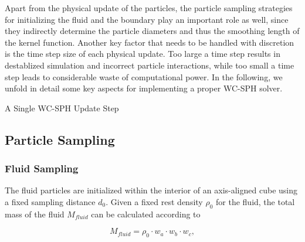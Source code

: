 \documentclass[
	11pt, 
	DIV10,
	ngerman,
	a4paper, 
	oneside, 
	headings=normal, 
	captions=tableheading,
	final, 
	numbers=noenddot
]{scrartcl}
\begin{document}
Apart from the physical update of the particles, the particle sampling strategies for initializing the fluid and the boundary play an important role as well, since they indirectly determine the particle diameters and thus the smoothing length of the kernel function. Another key factor that needs to be handled with discretion is the time step size of each physical update. Too large a time step results in destablized simulation and incorrect particle interactions, while too small a time step leads to considerable waste of computational power. In the following, we unfold in detail some key aspects for implementing a proper WC-SPH solver.

\large
\begin{algorithm}
	\DontPrintSemicolon
	\SetAlgoLined
	\caption{\label{alg1} A Single WC-SPH Update Step}
\end{algorithm}
\normalsize

\subsection{Particle Sampling}
\subsubsection{Fluid Sampling}

The fluid particles are initialized within the interior of an axis-aligned cube using a fixed sampling distance $ d_{0} $. Given a fixed rest density $ \rho_{0} $ for the fluid, the total mass of the fluid $ M_{fluid} $ can be calculated according to

\begin{equation}
	\label{eq1}
	M_{fluid} = \rho_{0} \cdot w_{a} \cdot w_{b} \cdot w_{c},
\end{equation}
\end{document}
